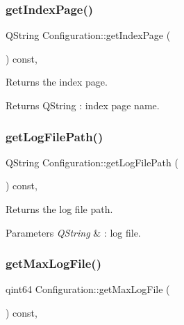\subsubsection{\texorpdfstring{get\+Index\+Page()}{getIndexPage()}}
{\footnotesize\ttfamily Q\+String Configuration\+::get\+Index\+Page (\begin{DoxyParamCaption}{ }\end{DoxyParamCaption}) const\hspace{0.3cm}{\ttfamily [inline]}, {\ttfamily [noexcept]}}



Returns the index page. 

\begin{DoxyReturn}{Returns}
Q\+String \+: index page name. 
\end{DoxyReturn}
\mbox{\label{class_configuration_a26a2c6ace6f2fbe725998a3ee3656b1c}} 
\subsubsection{\texorpdfstring{get\+Log\+File\+Path()}{getLogFilePath()}}
{\footnotesize\ttfamily Q\+String Configuration\+::get\+Log\+File\+Path (\begin{DoxyParamCaption}{ }\end{DoxyParamCaption}) const\hspace{0.3cm}{\ttfamily [inline]}, {\ttfamily [noexcept]}}



Returns the log file path. 


\begin{DoxyParams}{Parameters}
{\em Q\+String} & \+: log file. \\
\hline
\end{DoxyParams}
\mbox{\label{class_configuration_af0ff5f0aca0bd13e5676847db77bac58}} 
\subsubsection{\texorpdfstring{get\+Max\+Log\+File()}{getMaxLogFile()}}
{\footnotesize\ttfamily qint64 Configuration\+::get\+Max\+Log\+File (\begin{DoxyParamCaption}{ }\end{DoxyParamCaption}) const\hspace{0.3cm}{\ttfamily [inline]}, {\ttfamily [noexcept]}}



